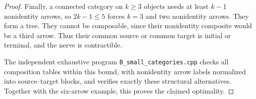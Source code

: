 \begin{proof}
Finally, a connected category on $k\geq3$ objects needs at least
$k-1$ nonidentity arrows, so $2k-1\leq5$ forces $k=3$ and two
nonidentity arrows. They form a tree. They cannot be composable,
since their nonidentity composite would be a third arrow. Thus their
common source or common target is initial or terminal, and the nerve
is contractible.

The independent exhaustive program \texttt{B\_small\_categories.cpp}
checks all composition tables within this bound, with nonidentity
arrow labels normalized into source--target blocks, and verifies exactly
these structural alternatives. Together with the six-arrow example,
this proves the claimed optimality.
\end{proof}
